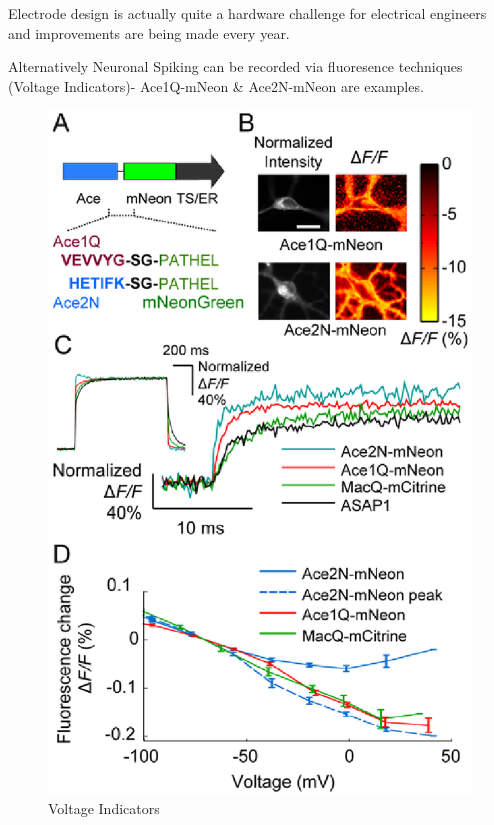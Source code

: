 \documentclass[main]{subfiles}
\begin{document}
Electrode design is actually quite a hardware challenge for electrical engineers and improvements are being made every year.


Alternatively Neuronal Spiking can be recorded via fluoresence techniques (Voltage Indicators)- Ace1Q-mNeon \& Ace2N-mNeon are examples. 

\begin{figure}[H]
	\centering
	\includegraphics[width=0.9\linewidth]{09_WhySpikes/figures/Aceq.png}
	\caption{Voltage Indicators}
\end{figure}
\end{document}
